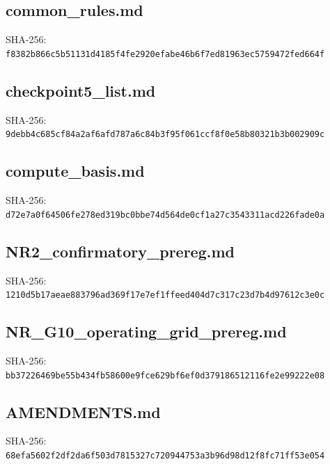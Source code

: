 \documentclass[10pt]{article}
\begin{document}
\subsection*{common\_rules.md}
\noindent SHA-256: \texttt{\footnotesize f8382b866c5b51131d4185f4fe2920efabe46b6f7ed81963ec5759472fed664f}\par\medskip

\clearpage
\subsection*{checkpoint5\_list.md}
\noindent SHA-256: \texttt{\footnotesize 9debb4c685cf84a2af6afd787a6c84b3f95f061ccf8f0e58b80321b3b002909c}\par\medskip

\clearpage
\subsection*{compute\_basis.md}
\noindent SHA-256: \texttt{\footnotesize d72e7a0f64506fe278ed319bc0bbe74d564de0cf1a27c3543311acd226fade0a}\par\medskip

\clearpage
\subsection*{NR2\_confirmatory\_prereg.md}
\noindent SHA-256: \texttt{\footnotesize 1210d5b17aeae883796ad369f17e7ef1ffeed404d7c317c23d7b4d97612c3e0c}\par\medskip

\clearpage
\subsection*{NR\_G10\_operating\_grid\_prereg.md}
\noindent SHA-256: \texttt{\footnotesize bb37226469be55b434fb58600e9fce629bf6ef0d379186512116fe2e99222e08}\par\medskip

\clearpage
\subsection*{AMENDMENTS.md}
\noindent SHA-256: \texttt{\footnotesize 68efa5602f2df2da6f503d7815327c720944753a3b96d98d12f8fc71ff53e054}\par\medskip

\clearpage
\end{document}
